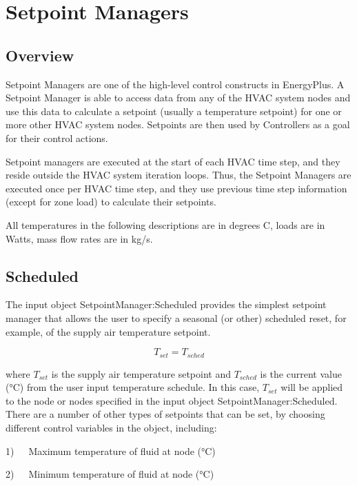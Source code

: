 \section{Setpoint Managers }\label{setpoint-managers}

\subsection{Overview}\label{overview-024}

Setpoint Managers are one of the high-level control constructs in EnergyPlus. A Setpoint Manager is able to access data from any of the HVAC system nodes and use this data to calculate a setpoint (usually a temperature setpoint) for one or more other HVAC system nodes. Setpoints are then used by Controllers as a goal for their control actions.

Setpoint managers are executed at the start of each HVAC time step, and they reside outside the HVAC system iteration loops. Thus, the Setpoint Managers are executed once per HVAC time step, and they use previous time step information (except for zone load) to calculate their setpoints.

All temperatures in the following descriptions are in degrees C, loads are in Watts, mass flow rates are in kg/s.

\subsection{Scheduled}\label{scheduled}

The input object SetpointManager:Scheduled provides the simplest setpoint manager that allows the user to specify a seasonal (or other) scheduled reset, for example, of the supply air temperature setpoint.

\begin{equation}
{T_{set}} = {T_{sched}}
\end{equation}

where \({T_{set}}\) is the supply air temperature setpoint and \({T_{sched}}\) is the current value (°C) from the user input temperature schedule. In this case, \({T_{set}}\) will be applied to the node or nodes specified in the input object SetpointManager:Scheduled.~ There are a number of other types of setpoints that can be set, by choosing different control variables in the object, including:

1)~~~Maximum temperature of fluid at node (°C)

2)~~~Minimum temperature of fluid at node (°C)

